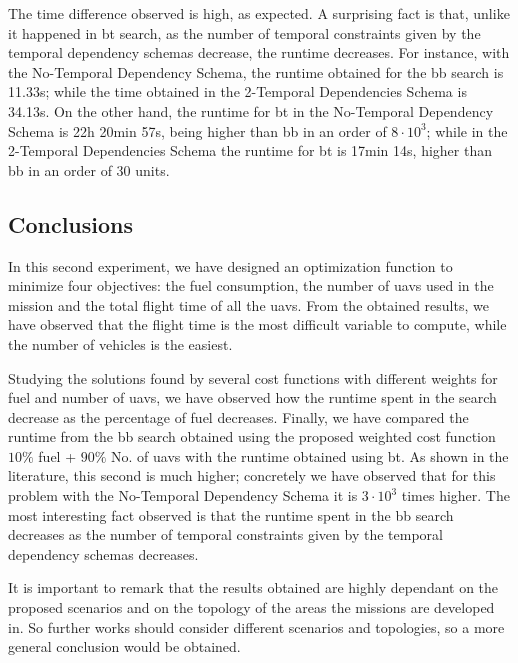 The time difference observed is high, as expected. A surprising fact is that, unlike it happened in \gls{bt} search, as the number of temporal constraints given by the temporal dependency schemas decrease, the runtime decreases. For instance, with the No-Temporal Dependency Schema, the runtime obtained for the \gls{bb} search is 11.33s; while the time obtained in the 2-Temporal Dependencies Schema is 34.13s. On the other hand, the runtime for \gls{bt} in the No-Temporal Dependency Schema is 22h 20min 57s, being higher than \gls{bb} in an order of $8 \cdot 10^3$; while in the 2-Temporal Dependencies Schema the runtime for \gls{bt} is 17min 14s, higher than \gls{bb} in an order of $30$ units.


\subsection{Conclusions}
In this second experiment, we have designed an optimization function to minimize four objectives: the fuel consumption, the number of \glspl{uav} used in the mission and the total flight time of all the \glspl{uav}. From the obtained results, we have observed that the flight time is the most difficult variable to compute, while the number of vehicles is the easiest.

Studying the solutions found by several cost functions with different weights for fuel and number of \glspl{uav}, we have observed how the runtime spent in the search decrease as the percentage of fuel decreases. Finally, we have compared the runtime from the \gls{bb} search obtained using the proposed weighted cost function $10\%$ fuel + $90\%$ No. of \glspl{uav} with the runtime obtained using \gls{bt}. As shown in the literature, this second is much higher; concretely we have observed that for this problem with the No-Temporal Dependency Schema it is $3 \cdot 10^3$ times higher. The most interesting fact observed is that the runtime spent in the \gls{bb} search decreases as the number of temporal constraints given by the temporal dependency schemas decreases.

It is important to remark that the results obtained are highly dependant on the proposed scenarios and on the topology of the areas the missions are developed in. So further works should consider different scenarios and topologies, so a more general conclusion would be obtained.

\NewPage
